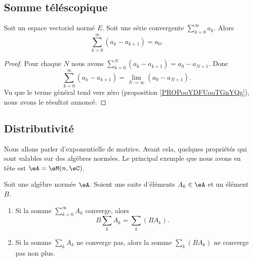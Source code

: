 \subsection{Somme téléscopique}

\begin{proposition}	\label{PROPooQLOUooTDWfFF}
	Soit un espace vectoriel normé \( E\). Soit une série convergente \( \sum_{k=0}^{\infty}a_k\). Alors
	\begin{equation}
		\sum_{k=0}^{\infty}(a_k-a_{k+1})=a_0.
	\end{equation}
\end{proposition}

\begin{proof}
	Pour chaque \( N\) nous avons \( \sum_{k=0}^N(a_k-a_{k+1})=a_0-a_{N+1}\). Donc
	\begin{equation}
		\sum_{k=0}^{\infty}(a_k-a_{k+1})=\lim_{N\to \infty}(a_0-a_{N+1}).
	\end{equation}
	Vu que le terme général tend vers zéro (proposition \ref{PROPooYDFUooTGnYQg}), nous avons le résultat annoncé.
\end{proof}

\subsection{Distributivité}

Nous allons parler d'exponentielle de matrice. Avant cela, quelques propriétés qui sont valables sur des algèbres normées. Le principal exemple que nous avons en tête est \( \eA=\eM(n,\eC)\).

\begin{proposition}      \label{PROPooMZZQooEhQsgQ}
	Soit une algèbre normée \( \eA\). Soient une suite d'éléments \( A_k\in \eA\) et un élément \( B\).
	\begin{enumerate}
		\item		\label{ITEMooVWMQooLqerEc}
		      Si la somme \( \sum_{k=0}^{\infty}A_k\) converge, alors
		      \begin{equation}		\label{EQooPOFWooGNWIUF}
			      B\sum_kA_k=\sum_k(BA_k).
		      \end{equation}
		\item		\label{ITEMooRLRYooQodIkq}
		      Si la somme \( \sum_kA_k\) ne converge pas, alors la somme \( \sum_k(BA_k)\) ne converge pas non plus.
	\end{enumerate}
\end{proposition}

